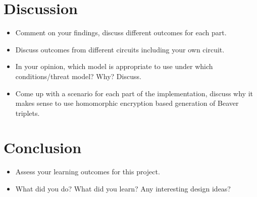 \documentclass[10pt,conference]{IEEEtran}
\begin{document}
\section{Discussion}
\begin{itemize}
    \item Comment on your findings, discuss different outcomes for each part.
    \item Discuss outcomes from different circuits including your own circuit.
    \item In your opinion, which model is appropriate to use under which conditions/threat model? Why? Discuss.
    \item Come up with a scenario for each part of the implementation, discuss why it makes sense to use homomorphic encryption based generation of Beaver triplets.
\end{itemize}

\section{Conclusion}
\begin{itemize}
    \item Assess your learning outcomes for this project.
    \item What did you do? What did you learn? Any interesting design ideas? 
\end{itemize}



\end{document}
